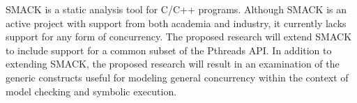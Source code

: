 SMACK is a static analysis tool for C/C++ programs.  Although SMACK is an active project with support from both academia and industry, it currently lacks support for any form of concurrency.  The proposed research will extend SMACK to include support for a common subset of the Pthreads API.  In addition to extending SMACK, the proposed research will result in an examination of the generic constructs useful for modeling general concurrency within the context of model checking and symbolic execution.
